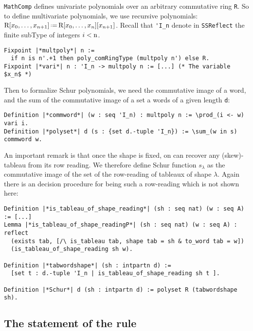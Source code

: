 \documentclass[12pt]{article}
\let\verb=\lstinline
\newcommand{\SSR}{\texttt{SSReflect}\xspace}
\newcommand{\MC}{\texttt{MathComp}\xspace}
\newcommand{\var}[1]{\text{\verb{#1}}}
\newcommand{\eqdef}{\mbox{\,\raisebox{0.2ex}{\scriptsize\ensuremath{\mathrm:}}\ensuremath{=}\,}} %
\begin{document}
\MC defines univariate polynomials over an arbitrary commutative ring
\verb{R}. So to define multivariate polynomials, we use recursive polynomials:
$\var{R}[x_0,\dots,x_{n+1}]\eqdef\var{R}[x_0,\dots,x_n][x_{n+1}]$. Recall
that \verb{'I_n} denote in \SSR the finite subType of integers
$i < \var{n}$.
\begin{lstlisting}
Fixpoint |*multpoly*| n :=
  if n is n'.+1 then poly_comRingType (multpoly n') else R.
Fixpoint |*vari*| n : 'I_n -> multpoly n := [...] (* The variable $x_n$ *)
\end{lstlisting}
Then to formalize Schur polynomials, we need the commutative image of a word,
and the sum of the commutative image of a set a words of a given length
\verb{d}:
\begin{lstlisting}
Definition |*commword*| (w : seq 'I_n) : multpoly n := \prod_(i <- w) vari i.
Definition |*polyset*| d (s : {set d.-tuple 'I_n}) := \sum_(w in s) commword w.
\end{lstlisting}
An important remark is that once the shape is fixed, on can recover any
(skew)-tableau from its row reading. We therefore define Schur function
$s_\lambda$ as the commutative image of the set of the row-reading of tableaux
of shape $\lambda$. Again there is an decision procedure for being such a
row-reading which is not shown here:
\begin{lstlisting}
Definition |*is_tableau_of_shape_reading*| (sh : seq nat) (w : seq A) := [...]
Lemma |*is_tableau_of_shape_readingP*| (sh : seq nat) (w : seq A) : reflect
  (exists tab, [/\ is_tableau tab, shape tab = sh & to_word tab = w])
  (is_tableau_of_shape_reading sh w).

Definition |*tabwordshape*| (sh : intpartn d) :=
  [set t : d.-tuple 'I_n | is_tableau_of_shape_reading sh t ].

Definition |*Schur*| d (sh : intpartn d) := polyset R (tabwordshape sh).
\end{lstlisting}
\subsection{The statement of the rule}
\end{document}
